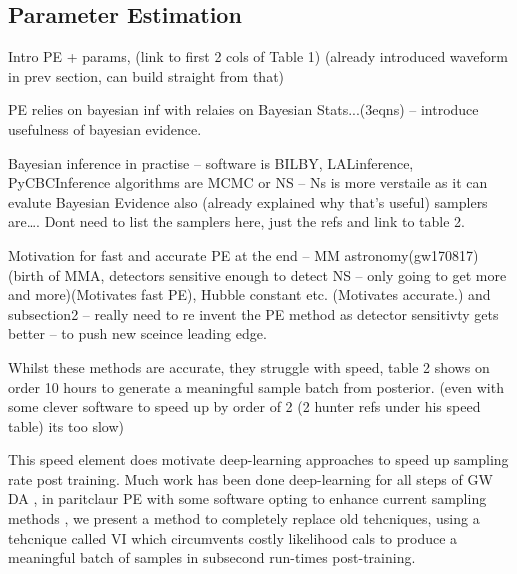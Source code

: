 \documentclass[aps,superscriptaddress,twocolumn,nopreprintnumbers,floatfix,groupedaddress]{revtex4-1}
\begin{document}
\subsection{Parameter Estimation}

Intro PE + params, (link to first 2 cols of Table 1) (already introduced waveform in prev section, can build straight from that) 

PE relies on bayesian inf with relaies on Bayesian Stats...(3eqns) – introduce usefulness of bayesian evidence.

Bayesian inference in practise – software is BILBY, LALinference, PyCBCInference \cite{lalinference,PyCBCInference,bilby} algorithms are MCMC or NS – Ns is more verstaile as it can evalute Bayesian Evidence also (already explained why that’s useful) samplers are…. Dont need to list the samplers here, just the refs and link to table 2.

Motivation for fast and accurate PE at the end – MM astronomy(gw170817) (birth of MMA, detectors sensitive enough to detect NS – only going to get more and more)(Motivates fast PE), Hubble constant etc. (Motivates accurate.) and subsection2 – really need to re invent the PE method as detector sensitivty gets better – to push new sceince leading edge.

Whilst these methods are accurate, they struggle with speed, table 2 shows on order 10 hours to generate a meaningful sample batch from posterior. (even with some clever software to speed up by order of 2 (2 hunter refs under his speed table) its too slow)

This speed element does motivate deep-learning approaches to speed up sampling rate post training. Much work has been done deep-learning for all steps of GW DA \cite{mlreview2020}, in paritclaur PE with some software opting to enhance current sampling methods \cite{williams2021nested}, we present a method to completely replace old tehcniques, using a tehcnique called VI \cite{1904.06264} which circumvents costly likelihood cals to produce a meaningful batch of samples in subsecond run-times post-training.
\end{document}

